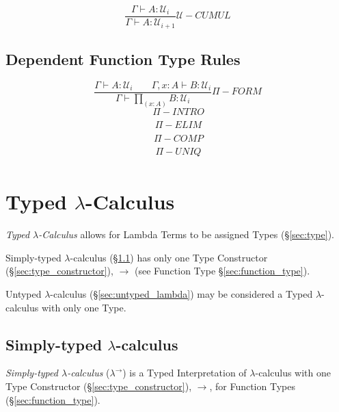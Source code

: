 \[
  {
    \frac
    {\Gamma \vdash A : \mathcal{U}_i}
    {\Gamma \vdash A : \mathcal{U}_{i+1}}
  } \mathcal{U}-CUMUL
\]



\subsection{Dependent Function Type Rules}\label{sec:dependent_rules}

\[
  {
    \frac
    {\Gamma \vdash A : \mathcal{U}_i \;\;\;\;\;\;\;
    \Gamma,x:A \vdash B : \mathcal{U}_i}
    {\Gamma \vdash \prod_{(x:A)} B : \mathcal{U}_i}
  } \Pi-FORM
\]\[
  {
    \frac
    {}
    {}
  } \Pi-INTRO
\]\[
  {
    \frac
    {}
    {}
  } \Pi-ELIM
\]\[
  {
    \frac
    {}
    {}
  } \Pi-COMP
\]\[
  {
    \frac
    {}
    {}
  } \Pi-UNIQ
\]



\section{Typed $\lambda$-Calculus}\label{sec:typed_lambda}

\emph{Typed $\lambda$-Calculus} allows for Lambda Terms to be assigned
Types (\S\ref{sec:type}).

Simply-typed $\lambda$-calculus (\S\ref{sec:simply_typed}) has only
one Type Constructor (\S\ref{sec:type_constructor}), $\rightarrow$
(see Function Type \S\ref{sec:function_type}).

Untyped $\lambda$-calculus (\S\ref{sec:untyped_lambda}) may be
considered a Typed $\lambda$-calculus with only one Type.



\subsection{Simply-typed $\lambda$-calculus}\label{sec:simply_typed}

\emph{Simply-typed $\lambda$-calculus} ($\lambda^\rightarrow$) is a
Typed Interpretation of $\lambda$-calculus with one Type Constructor
(\S\ref{sec:type_constructor}), $\rightarrow$, for Function Types
(\S\ref{sec:function_type}).

